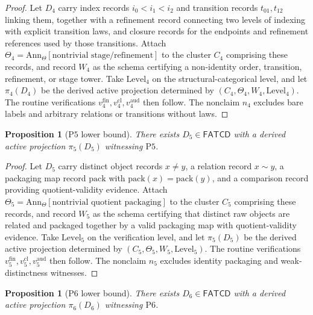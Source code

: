 \documentclass[11pt]{article}
\newtheorem{proposition}[theorem]{Proposition}
\theoremstyle{definition}
\newcommand{\FATCD}{\ensuremath{\mathsf{FATCD}}}
\newcommand{\Pfive}{\ensuremath{\mathrm{P5}}}
\newcommand{\Psix}{\ensuremath{\mathrm{P6}}}
\begin{document}
\begin{proof}
Let \(D_4\) carry index records \(i_0 < i_1 < i_2\) and transition
records \(t_{01}, t_{12}\) linking them, together with a refinement
record connecting two levels of indexing with explicit transition laws,
and closure records for the endpoints and refinement references used by
those transitions. Attach
\(\Theta_4 = \mathrm{Ann}_\Theta[\text{nontrivial stage/refinement}]\)
to the cluster \(C_4\) comprising these records, and record \(W_4\) as
the schema certifying a non-identity
order, transition, refinement, or stage tower. Take
\(\mathrm{Level}_4\) on the structural-categorical level, and let
\(\pi_4(D_4)\) be the derived active projection determined by
\((C_4,\Theta_4,W_4,\mathrm{Level}_4)\). The routine verifications
\(v_4^{\mathrm{fin}}, v_4^{\mathrm{cl}}, v_4^{\mathrm{aud}}\) then
follow. The nonclaim \(n_4\) excludes bare labels and arbitrary
relations or transitions without laws.
\end{proof}

\begin{proposition}[\Pfive{} lower bound]\label{prop:p5-witness}
There exists \(D_5 \in \FATCD{}\) with a derived active projection
\(\pi_5(D_5)\) witnessing \Pfive{}.
\end{proposition}

\begin{proof}
Let \(D_5\) carry distinct object records \(x \ne y\), a relation
record \(x \sim y\), a packaging map record
\(\mathrm{pack}\) with \(\mathrm{pack}(x) = \mathrm{pack}(y)\), and a
comparison record providing quotient-validity evidence. Attach
\(\Theta_5 = \mathrm{Ann}_\Theta[\text{nontrivial quotient packaging}]\)
to the cluster \(C_5\) comprising these records, and record \(W_5\) as
the schema certifying
that distinct raw objects are related and packaged together by a valid
packaging map with quotient-validity evidence. Take
\(\mathrm{Level}_5\) on the verification level, and let \(\pi_5(D_5)\)
be the derived active projection determined by
\((C_5,\Theta_5,W_5,\mathrm{Level}_5)\). The routine verifications
\(v_5^{\mathrm{fin}}, v_5^{\mathrm{cl}}, v_5^{\mathrm{aud}}\) then
follow. The nonclaim \(n_5\) excludes identity packaging and
weak-distinctness witnesses.
\end{proof}

\begin{proposition}[\Psix{} lower bound]\label{prop:p6-witness}
There exists \(D_6 \in \FATCD{}\) with a derived active projection
\(\pi_6(D_6)\) witnessing \Psix{}.
\end{proposition}
\end{document}
